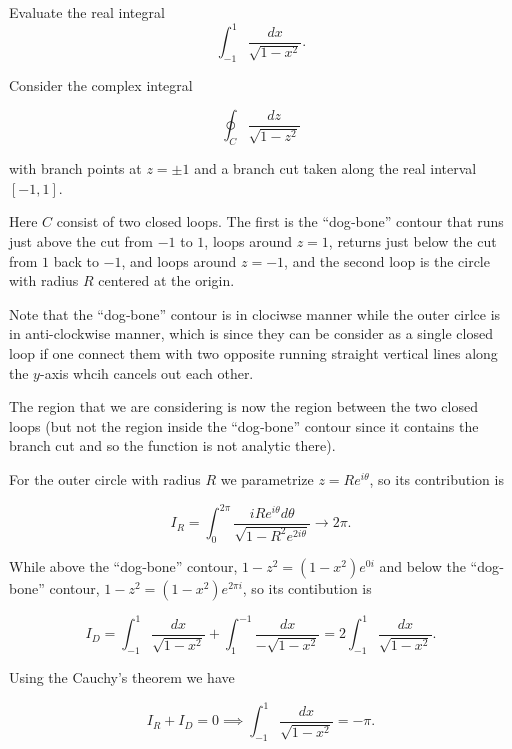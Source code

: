 \documentclass[english,a4paper,12pt]{report}
\begin{document}
{Evaluate the real integral
\begin{equation}
  \int_{-1}^{1}\frac{dx}{\sqrt{1 - x^{2}}}.
\end{equation}
}
{Consider the complex integral

\begin{equation}
  \oint_{C} \frac{dz}{\sqrt{1-z^2} }  
\end{equation}

with branch points at \(z=\pm1\) and a branch cut taken along the real interval \([-1,1]\). 

Here \(C\) consist of two closed loops. The first is the “dog‐bone” contour that runs just above the cut from \(-1\) to \(1\), loops around \(z=1\), returns just below the cut from \(1\) back to \(-1\), and loops around \(z=-1\), and the second loop is the circle with radius \(R\) centered at the origin.

Note that the “dog‐bone” contour is in clociwse manner while the outer cirlce is in anti-clockwise manner, which is since they can be consider as a single closed loop if one connect them with two opposite running straight vertical lines along the \(y\)-axis whcih cancels out each other. 

The region that we are considering is now the region between the two closed loops (but not the region inside the “dog‐bone” contour since it contains the branch cut and so the function is not analytic there).

For the outer circle with radius \(R\) we parametrize \(z = Re^{i \theta } \), so its contribution is 

\begin{equation}
    I_{R} = \int_{0}^{2\pi } \frac{i Re^{i \theta } d \theta }{\sqrt{1- R^2e^{2i \theta } } } \to 2\pi. 
\end{equation}

While above the “dog‐bone” contour, \(1-z^2 = (1-x^2)e^{0i} \) and below the “dog‐bone” contour, \(1-z^2 = (1-x^2)e^{2\pi i} \), so its contibution is 

\begin{equation}
    I_{D} = \int_{-1}^{1} \frac{dx}{\sqrt{1-x^2} } + \int_{1}^{-1} \frac{dx}{-\sqrt{1-x^2} }  = 2\int_{-1}^{1} \frac{dx}{\sqrt{1-x^2} }.       
\end{equation}

Using the Cauchy's theorem we have 

\begin{equation}
    I_{R} + I_{D} = 0 \implies \int_{-1}^{1} \frac{dx}{\sqrt{1-x^2} } = -\pi .
\end{equation}



}
\end{document}
